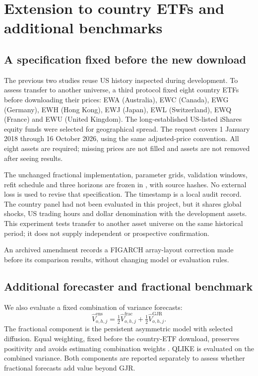 \documentclass[12pt,a4paper]{article}
\begin{document}
\section{Extension to country ETFs and additional benchmarks}
\label{sec:external}
\subsection{A specification fixed before the new download}
The previous two studies reuse US history inspected during development. To
assess transfer to another universe, a third protocol fixed eight country ETFs
before downloading their prices: EWA (Australia), EWC (Canada), EWG (Germany),
EWH (Hong Kong), EWJ (Japan), EWL (Switzerland), EWQ (France) and EWU (United
Kingdom). The long-established US-listed iShares equity funds were selected
for geographical spread. The request covers 1 January 2018 through 16 October
2026, using the same adjusted-price convention. All eight assets are required;
missing prices are not filled and assets are not removed after seeing results.

The unchanged fractional implementation, parameter grids, validation windows,
refit schedule and three horizons are frozen in
, with source hashes. No external loss is
used to revise that specification. The timestamp is a local audit record.
The country panel had not been evaluated in this project, but it shares
global shocks, US trading hours and dollar denomination with the development
assets. This experiment tests transfer to another asset universe on the
same historical period; it does not supply independent or prospective
confirmation.

An archived amendment records a FIGARCH array-layout correction made before
its comparison results, without changing model or evaluation rules.

\subsection{Additional forecaster and fractional benchmark}
We also evaluate a fixed combination of variance forecasts:
\begin{equation}
\widehat V^{\mathrm{ens}}_{o,h,j}
=\tfrac12\widehat V^{\mathrm{frac}}_{o,h,j}
+\tfrac12\widehat V^{\mathrm{GJR}}_{o,h,j}.
\label{eq:ensemble}
\end{equation}
The fractional component is the persistent asymmetric model with selected
diffusion. Equal weighting, fixed before the country-ETF download, preserves
positivity and avoids estimating combination weights \citep{timmermann2006}.
QLIKE is evaluated on the combined variance. Both components are reported
separately to assess whether fractional forecasts add value beyond GJR.
\end{document}
